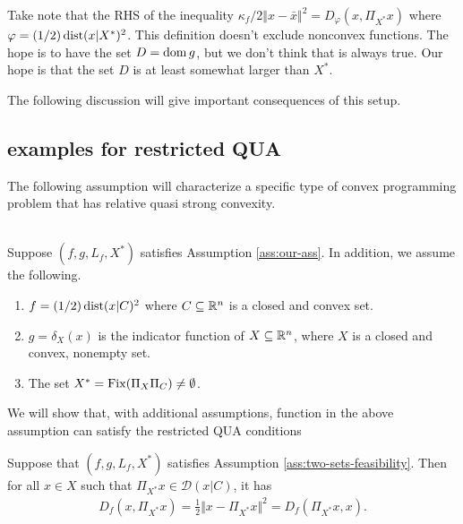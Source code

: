 \documentclass[12pt]{article}
\begin{document}
    \begin{remark}
        Take note that the RHS of the inequality $\kappa_f/2 \Vert x - \bar x\Vert^2 = D_\varphi(x, \Pi_{X^*}x)$ where $\varphi = (1/2)\operatorname{dist}(x | X^*)^2$. 
        This definition doesn't exclude nonconvex functions. 
        The hope is to have the set $D = \operatorname{dom} g$, but we don't think that is always true. 
        Our hope is that the set $D$ is at least somewhat larger than $X^*$. 
    \end{remark}
    The following discussion will give important consequences of this setup. 
    \subsection{examples for restricted QUA}
        The following assumption will characterize a specific type of convex programming problem that has relative quasi strong convexity. 
        \begin{assumption}\;\label{ass:two-sets-feasibility}\\
            Suppose $(f, g, L_f, X^*)$ satisfies Assumption \ref{ass:our-ass}. 
            In addition, we assume the following. 
            \begin{enumerate}[nosep]
                \item $f = (1/2)\operatorname{dist}(x | C)^2$ where $C \subseteq \mathbb R^n$ is a closed and convex set. 
                \item $g = \delta_X(x)$ is the indicator function of $X \subseteq \mathbb R^n$, where $X$ is a closed and convex, nonempty set. 
                \item The set $X^* = \operatorname{Fix}(\Pi_X \Pi_C) \neq \emptyset$. 
            \end{enumerate}
        \end{assumption}
        We will show that, with additional assumptions, function in the above assumption can satisfy the restricted QUA conditions 
        \begin{theorem}\label{thm:example-rqua}
            Suppose that $(f, g, L_f, X^*)$ satisfies Assumption \ref{ass:two-sets-feasibility}. 
            Then for all $x\in X$ such that $\Pi_{X^*} x\in \mathcal D(x | C)$, it has 
            \begin{align*}
                D_f(x, \Pi_{X^*}x) = \frac{1}{2}\Vert x - \Pi_{X^*} x\Vert^2 = D_f(\Pi_{X^*}x, x). 
            \end{align*}
        \end{theorem}
\end{document}
